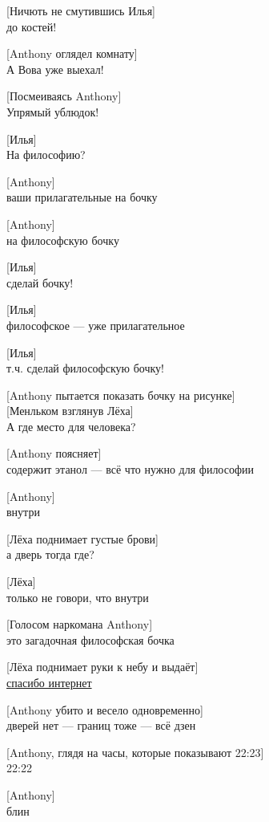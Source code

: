 [Ничють не смутившись Илья]\\
до костей!


[Anthony оглядел комнату]\\
А Вова уже выехал!


[Посмеиваясь Anthony]\\
Упрямый ублюдок!


[Илья]\\
На философию?


[Anthony]\\
ваши прилагательные на бочку


[Anthony]\\
на философскую бочку


[Илья]\\
сделай бочку!


[Илья]\\
философское — уже прилагательное


[Илья]\\
т.ч. сделай философскую бочку!


[Anthony пытается показать бочку на рисунке]\\
[\href{https://thumbs.dreamstime.com/thumb_850/8505013.jpg}{Рисунок}]


[Менльком взглянув Лёха]\\
А где место для человека?


[Anthony поясняет]\\
содержит этанол --- всё что нужно для философии


[Anthony]\\
внутри


[Лёха поднимает густые брови]\\
а дверь тогда где?


[Лёха]\\
только не говори, что внутри


[Голосом наркомана Anthony]\\
это загадочная философская бочка


[Лёха поднимает руки к небу и выдаёт]\\
\href{http://sad.co.ua/wp-content/uploads/2014/07/dveri-bochka.png}{спасибо интернет}


[Anthony убито и весело одновременно]\\
дверей нет --- границ тоже --- всё дзен


[Anthony, глядя на часы, которые показывают 22:23]\\
22:22


[Anthony]\\
блин


